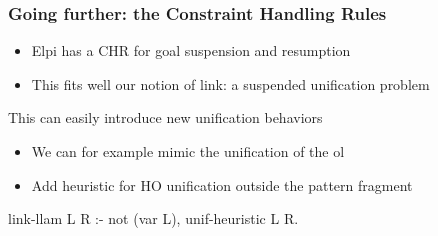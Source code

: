 \documentclass{pres}
\begin{document}
\begin{frame}[fragile]
  \frametitle{Going further: the Constraint Handling Rules}

  \begin{itemize}
    \item Elpi has a CHR for goal suspension and resumption
    \item This fits well our notion of link: a suspended unification problem
  \end{itemize}


  \mysep

  This can easily introduce new unification behaviors
  \begin{itemize}
    \item We can for example mimic the unification of the ol
    \item Add heuristic for HO unification outside the pattern fragment
  \end{itemize}

  \mysep

  \begin{elpicode}
    link-llam L R :- not (var L), unif-heuristic L R.
  \end{elpicode}



\end{frame}
\end{document}
